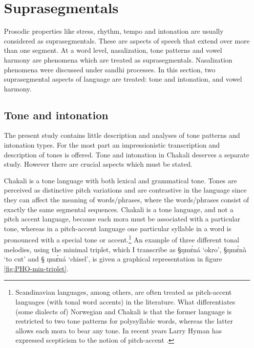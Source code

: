 \section{Suprasegmentals}
\label{sec:suprasegmentals}


Prosodic properties like stress, rhythm, tempo and intonation are usually
considered as suprasegmentals. These are aspects of speech that extend over
more than one segment.  At a word level,  nasalization, tone patterns and vowel
harmony are phenomena which are treated as suprasegmentals. Nasalization
phenomena were discussed under sandhi processes.  In this section,  two
suprasegmental aspects of language are treated: tone and intonation, and vowel
harmony.


\subsection{Tone and intonation}
\label{sec:tone-intonation}

The present study contains little description and analyses  of tone patterns and
intonation types. For the most part an impressionistic transcription and
description of tones is offered. Tone and intonation in Chakali deserves a
separate study. However there are crucial aspects which must be stated. 


Chakali is a tone language with both lexical and grammatical tone. Tones are
perceived as distinctive pitch variations and are contrastive in the language
since they can affect the meaning of  words/phrases, where the words/phrases
consist of exactly the same segmental sequences.  Chakali is a tone language,
and not a pitch accent language, because each mora must be associated with a
particular tone, whereas in a pitch-accent language one particular syllable in a
word is pronounced with a special tone or accent.\footnote{Scandinavian
languages, among others, are often treated as pitch-accent languages (with tonal
word accents) in the literature. What differentiates (some dialects of)
Norwegian and Chakali is that the former language is restricted to two tone
patterns for polysyllabic words,  whereas the latter allows each  mora to bear
any tone.  In recent years Larry Hyman has expressed  scepticism to the notion
of pitch-accent   \citep{Hyma07}.}  An example of three different tonal
melodies, using
the minimal triplet, which I transcribe as  {\S ŋmɛ́ná} `okro', {\S ŋmɛ́nà}
`to cut' and {\S
ŋmɛ̀ná}   `chisel',   is given a graphical representation in figure
\ref{fig:PHO-min-triplet}.


